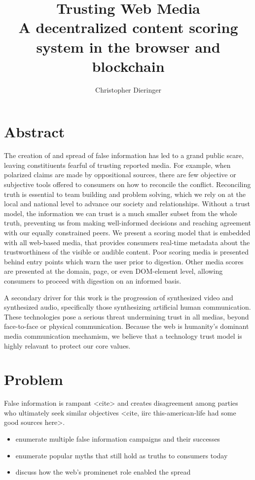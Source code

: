 \documentclass{paper}
\begin{document}
\title{%
Trusting Web Media \\
\large A decentralized content scoring system in the browser and blockchain}

\author{Christopher Dieringer}

\maketitle
\newpage

\section{Abstract}
The creation of and spread of false information has led to
a grand public scare, leaving constitiuents fearful of trusting
reported media.  For example, when polarized claims are made by oppositional
sources, there are few objective or subjective tools offered to consumers
on how to reconcile the conflict.  Reconciling truth is essential to
team building and problem solving, which we rely on at the local and national
level to advance our society and relationships.  Without a trust model, the
information we can trust is a much smaller subset from the whole truth,
preventing us from making well-informed decisions and reaching agreement with
our equally constrained peers.  We present a scoring model that is embedded with
all web-based media, that provides consumers real-time metadata about the
trustworthiness of the visible or audible content.  Poor scoring media is
presented behind entry points which warn the user prior to digestion.  Other
media scores are presented at the domain, page, or even DOM-element level,
allowing consumers to proceed with digestion on an informed basis.

A secondary driver for this work is the progression of synthesized video and
synthesized audio, specifically those synthesizing artificial human communication.
These technologies pose a
serious threat undermining trust in all medias, beyond face-to-face or physical
communication.  Because the web is humanity's dominant media communication
mechamism, we believe that a technology trust model is highly relavant
to protect our core values.

\section{Problem}

False information is rampant <cite> and creates disagreement among parties who
ultimately seek similar objectives <cite, iirc this-american-life had some good sources here>.
\begin{itemize}
  \item enumerate multiple false information campaigns and their successes
  \item enumerate popular myths that still hold as truths to consumers today
  \item discuss how the web's prominenet role enabled the spread
\end{itemize}
\end{document}
